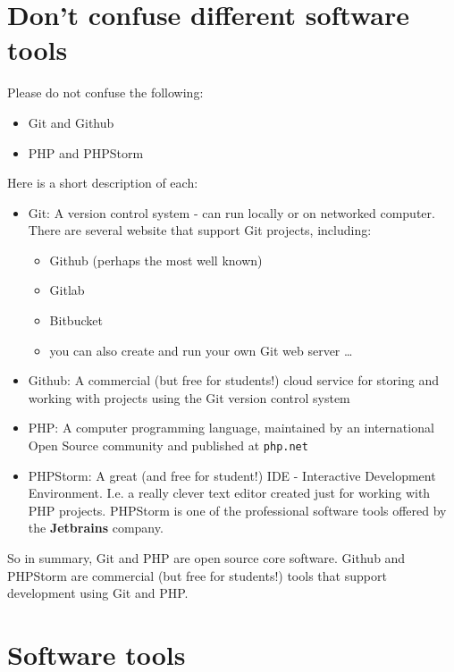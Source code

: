 \documentclass[a4paperpaper,openright]{book}
\providecommand{\tightlist}{%
  \setlength{\itemsep}{0pt}\setlength{\parskip}{0pt}}
\begin{document}
\hypertarget{dont-confuse-different-software-tools}{%
\section{Don't confuse different software
tools}\label{dont-confuse-different-software-tools}}

Please do not confuse the following:

\begin{itemize}
\tightlist
\item
  Git and Github
\item
  PHP and PHPStorm
\end{itemize}

Here is a short description of each:

\begin{itemize}
\item
  Git: A version control system - can run locally or on networked
  computer. There are several website that support Git projects,
  including:

  \begin{itemize}
  \tightlist
  \item
    Github (perhaps the most well known)
  \item
    Gitlab
  \item
    Bitbucket
  \item
    you can also create and run your own Git web server \ldots{}
  \end{itemize}
\item
  Github: A commercial (but free for students!) cloud service for
  storing and working with projects using the Git version control system
\item
  PHP: A computer programming language, maintained by an international
  Open Source community and published at \texttt{php.net}
\item
  PHPStorm: A great (and free for student!) IDE - Interactive
  Development Environment. I.e. a really clever text editor created just
  for working with PHP projects. PHPStorm is one of the professional
  software tools offered by the \textbf{Jetbrains} company.
\end{itemize}

So in summary, Git and PHP are open source core software. Github and
PHPStorm are commercial (but free for students!) tools that support
development using Git and PHP.

\hypertarget{software-tools}{%
\section{Software tools}\label{software-tools}}
\end{document}
